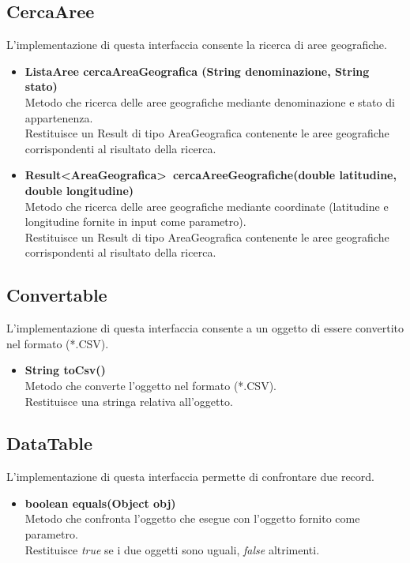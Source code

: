 \documentclass[a4paper, 12pt]{scrreprt}
\begin{document}
			\subsection{CercaAree}
			L'implementazione di questa interfaccia consente la ricerca di aree geografiche.
			\begin{itemize}
				\item \textbf{ListaAree cercaAreaGeografica (String denominazione, String stato)}
				\\Metodo che ricerca delle aree geografiche mediante denominazione e stato di appartenenza.
				\\Restituisce un Result di tipo AreaGeografica contenente le aree geografiche corrispondenti al risultato della ricerca.
				
				\item\textbf{Result\textless AreaGeografica\textgreater~cercaAreeGeografiche(double latitudine, double longitudine)}
				\\Metodo che ricerca delle aree geografiche mediante coordinate (latitudine e longitudine fornite in input come parametro).
				\\Restituisce un Result di tipo AreaGeografica contenente le aree geografiche corrispondenti al risultato della ricerca.
				
			\end{itemize}

			\subsection{Convertable}
			L'implementazione di questa interfaccia consente a un oggetto di essere convertito nel formato (*.CSV).
			\begin{itemize}
				\item \textbf{String toCsv()}
				\\Metodo che converte l'oggetto nel formato (*.CSV).
				\\Restituisce una stringa relativa all'oggetto.
				
			\end{itemize}
			\subsection{DataTable}
			L'implementazione di questa interfaccia permette di confrontare due record.
			\begin{itemize}
				\item\textbf{boolean equals(Object obj)}
				\\Metodo che confronta l'oggetto che esegue con l'oggetto fornito come parametro.
				\\Restituisce \textit{true} se i due oggetti sono uguali, \textit{false} altrimenti.
				
			\end{itemize}
\end{document}
